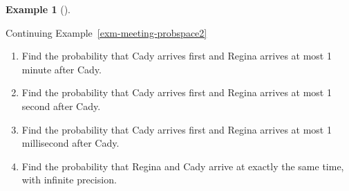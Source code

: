 \documentclass[
  letterpaper,
  DIV=11,
  numbers=noendperiod]{scrreprt}
\providecommand{\tightlist}{%
  \setlength{\itemsep}{0pt}\setlength{\parskip}{0pt}}
\theoremstyle{plain}
\theoremstyle{definition}
\newtheorem{example}{Example}[chapter]
\theoremstyle{definition}
\theoremstyle{definition}
\theoremstyle{remark}
\begin{document}
\begin{tcolorbox}[enhanced jigsaw, opacityback=0, left=2mm, colframe=quarto-callout-note-color-frame, toprule=.15mm, breakable, colback=white, leftrule=.75mm, arc=.35mm, rightrule=.15mm, bottomrule=.15mm]

\begin{example}[]\protect\hypertarget{exm-meeting-probspace2-limit}{}\label{exm-meeting-probspace2-limit}

Continuing Example~\ref{exm-meeting-probspace2}

\begin{enumerate}
\def\labelenumi{\arabic{enumi}.}
\tightlist
\item
  Find the probability that Cady arrives first and Regina arrives at
  most 1 minute after Cady.
\item
  Find the probability that Cady arrives first and Regina arrives at
  most 1 second after Cady.
\item
  Find the probability that Cady arrives first and Regina arrives at
  most 1 millisecond after Cady.
\item
  Find the probability that Regina and Cady arrive at exactly the same
  time, with infinite precision.
\end{enumerate}

\end{example}

\end{tcolorbox}
\end{document}
